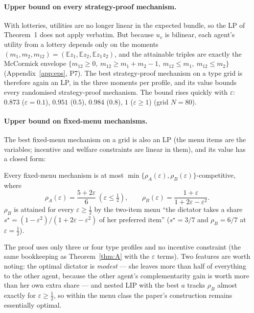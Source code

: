 \paragraph{Upper bound on every strategy-proof mechanism.} With lotteries, utilities are no
longer linear in the expected bundle, so the LP of Theorem~1 does not apply verbatim. But because
$u_v$ is bilinear, each agent's utility from a lottery depends only on the moments
$(m_1,m_2,m_{12})=(\mathbb E z_1,\mathbb E z_2,\mathbb E z_1z_2)$, and the attainable triples are
exactly the McCormick envelope $\{m_{12}\ge0,\ m_{12}\ge m_1+m_2-1,\ m_{12}\le m_1,\ m_{12}\le m_2\}$
(Appendix~\ref{app:eps}, P7). The best strategy-proof mechanism on a type grid is therefore
again an LP, in the three moments per profile, and its value bounds every randomised
strategy-proof mechanism. The bound rises quickly with $\varepsilon$: $0.873$ ($\varepsilon=0.1$),
$0.951$ ($0.5$), $0.984$ ($0.8$), $1$ ($\varepsilon\ge1$) (grid $N=80$).

\paragraph{Upper bound on fixed-menu mechanisms.} The best fixed-menu mechanism on a grid is also
an LP (the menu items are the variables; incentive and welfare constraints are linear in them),
and its value has a closed form:
\begin{theorem}[B]\label{thm:B}
Every fixed-menu mechanism is at most
$\min\{\rho_A(\varepsilon),\rho_B(\varepsilon)\}$-competitive, where
\[
\rho_A(\varepsilon)=\frac{5+2\varepsilon}{6}\ (\varepsilon\le\tfrac12),\qquad
\rho_B(\varepsilon)=\frac{1+\varepsilon}{1+2\varepsilon-\varepsilon^2}.
\]
$\rho_B$ is attained for every $\varepsilon\ge\tfrac12$ by the two-item menu ``the dictator takes a
share $s^\star=(1-\varepsilon^2)/(1+2\varepsilon-\varepsilon^2)$ of her preferred item'' ($s^\star=3/7$
and $\rho_B=6/7$ at $\varepsilon=\tfrac12$).
\end{theorem}
The proof uses only three or four type profiles and no incentive constraint (the same
bookkeeping as Theorem~\ref{thm:A} with the $\varepsilon$ terms). Two features are worth noting:
the optimal dictator is \emph{modest} --- she leaves more than half of everything to the other
agent, because the other agent's complementarity gain is worth more than her own extra share ---
and nested LIP with the best $a$ tracks $\rho_B$ almost exactly for $\varepsilon\ge\tfrac12$, so
within the menu class the paper's construction remains essentially optimal.


